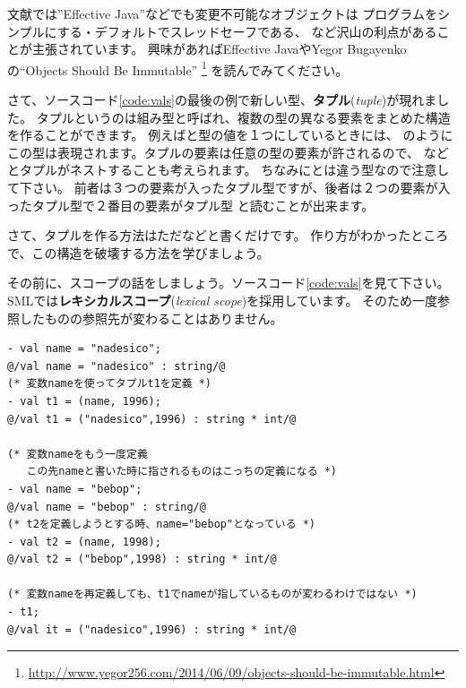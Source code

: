 \documentclass[11pt,a4paper]{jarticle}
\begin{document}
文献では''Effective Java''などでも変更不可能なオブジェクトは
プログラムをシンプルにする・デフォルトでスレッドセーフである、
など沢山の利点があることが主張されています。
興味があればEffective JavaやYegor Bugayenkoの``Objects Should Be Immutable''
\footnote{\url{http://www.yegor256.com/2014/06/09/objects-should-be-immutable.html}}
を読んでみてください。

さて、ソースコード\ref{code:vals}の最後の例で新しい型、{\bfseries タプル}({\itshape tuple})が現れました。
タプルというのは組み型と呼ばれ、複数の型の異なる要素をまとめた構造を作ることができます。
例えばと型の値を１つにしているときには、
のようにこの型は表現されます。タプルの要素は任意の型の要素が許されるので、
などとタプルがネストすることも考えられます。
ちなみにとは違う型なので注意して下さい。
前者は３つの要素が入ったタプル型ですが、後者は２つの要素が入ったタプル型で２番目の要素がタプル型
と読むことが出来ます。

さて、タプルを作る方法はただなどと書くだけです。
作り方がわかったところで、この構造を破壊する方法を学びましょう。

その前に、スコープの話をしましょう。ソースコード\ref{code:vals}を見て下さい。
SMLでは{\bfseries レキシカルスコープ}({\itshape lexical scope})を採用しています。
そのため一度参照したものの参照先が変わることはありません。

\begin{lstlisting}[caption=valのスコープ,label=code:vals]
- val name = "nadesico";
@/val name = "nadesico" : string/@
(* 変数nameを使ってタプルt1を定義 *)
- val t1 = (name, 1996);
@/val t1 = ("nadesico",1996) : string * int/@

(* 変数nameをもう一度定義
   この先nameと書いた時に指されるものはこっちの定義になる *)
- val name = "bebop";
@/val name = "bebop" : string/@
(* t2を定義しようとする時、name="bebop"となっている *)
- val t2 = (name, 1998);
@/val t2 = ("bebop",1998) : string * int/@

(* 変数nameを再定義しても、t1でnameが指しているものが変わるわけではない *)
- t1;
@/val it = ("nadesico",1996) : string * int/@
\end{lstlisting}
\end{document}

